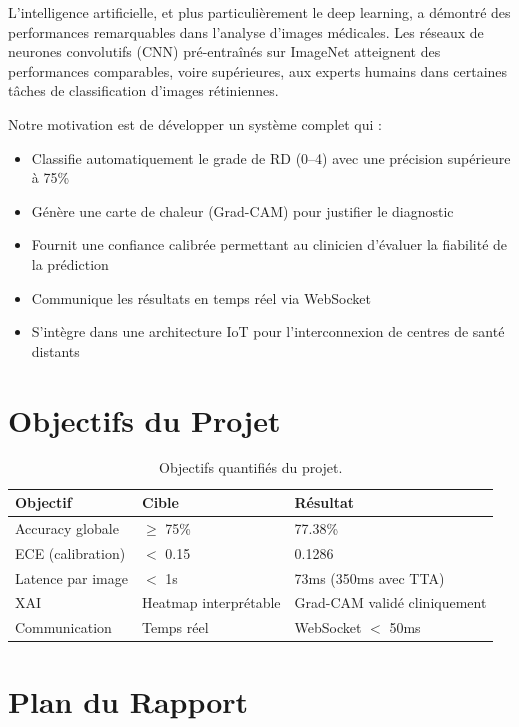 \documentclass[12pt,a4paper,oneside]{report}
\begin{document}
L'intelligence artificielle, et plus particulièrement le deep learning,
a démontré des performances remarquables dans l'analyse d'images médicales.
Les réseaux de neurones convolutifs (CNN) pré-entraînés sur ImageNet
atteignent des performances comparables, voire supérieures, aux experts
humains dans certaines tâches de classification d'images rétiniennes.

Notre motivation est de développer un système complet qui :
\begin{itemize}
    \item Classifie automatiquement le grade de RD (0--4) avec une
          précision supérieure à 75\%
    \item Génère une carte de chaleur (Grad-CAM) pour justifier le diagnostic
    \item Fournit une confiance calibrée permettant au clinicien d'évaluer
          la fiabilité de la prédiction
    \item Communique les résultats en temps réel via WebSocket
    \item S'intègre dans une architecture IoT pour l'interconnexion
          de centres de santé distants
\end{itemize}

\section{Objectifs du Projet}

\begin{table}[H]
\centering
\caption{Objectifs quantifiés du projet.}
\label{tab:objectifs}
\begin{tabular}{|l|l|l|}
\hline
\textbf{Objectif} & \textbf{Cible} & \textbf{Résultat} \\
\hline
Accuracy globale & $\geq$ 75\% & 77.38\% \\
ECE (calibration) & $<$ 0.15 & 0.1286 \\
Latence par image & $<$ 1s & 73ms (350ms avec TTA) \\
XAI & Heatmap interprétable & Grad-CAM validé cliniquement \\
Communication & Temps réel & WebSocket $<$ 50ms \\
\hline
\end{tabular}
\end{table}

\section{Plan du Rapport}
\end{document}
